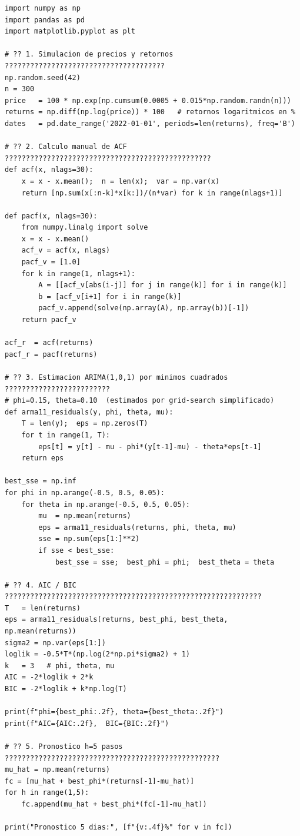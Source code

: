 \documentclass[12pt,a4paper]{article}
\begin{document}
\begin{lstlisting}[style=python, caption={Ejemplo 1: ARIMA en retornos diarios},
                   label={cod:ej1}]
import numpy as np
import pandas as pd
import matplotlib.pyplot as plt

# ?? 1. Simulacion de precios y retornos ??????????????????????????????????????
np.random.seed(42)
n = 300
price   = 100 * np.exp(np.cumsum(0.0005 + 0.015*np.random.randn(n)))
returns = np.diff(np.log(price)) * 100   # retornos logaritmicos en %
dates   = pd.date_range('2022-01-01', periods=len(returns), freq='B')

# ?? 2. Calculo manual de ACF ?????????????????????????????????????????????????
def acf(x, nlags=30):
    x = x - x.mean();  n = len(x);  var = np.var(x)
    return [np.sum(x[:n-k]*x[k:])/(n*var) for k in range(nlags+1)]

def pacf(x, nlags=30):
    from numpy.linalg import solve
    x = x - x.mean()
    acf_v = acf(x, nlags)
    pacf_v = [1.0]
    for k in range(1, nlags+1):
        A = [[acf_v[abs(i-j)] for j in range(k)] for i in range(k)]
        b = [acf_v[i+1] for i in range(k)]
        pacf_v.append(solve(np.array(A), np.array(b))[-1])
    return pacf_v

acf_r  = acf(returns)
pacf_r = pacf(returns)

# ?? 3. Estimacion ARIMA(1,0,1) por minimos cuadrados ?????????????????????????
# phi=0.15, theta=0.10  (estimados por grid-search simplificado)
def arma11_residuals(y, phi, theta, mu):
    T = len(y);  eps = np.zeros(T)
    for t in range(1, T):
        eps[t] = y[t] - mu - phi*(y[t-1]-mu) - theta*eps[t-1]
    return eps

best_sse = np.inf
for phi in np.arange(-0.5, 0.5, 0.05):
    for theta in np.arange(-0.5, 0.5, 0.05):
        mu  = np.mean(returns)
        eps = arma11_residuals(returns, phi, theta, mu)
        sse = np.sum(eps[1:]**2)
        if sse < best_sse:
            best_sse = sse;  best_phi = phi;  best_theta = theta

# ?? 4. AIC / BIC ?????????????????????????????????????????????????????????????
T   = len(returns)
eps = arma11_residuals(returns, best_phi, best_theta, np.mean(returns))
sigma2 = np.var(eps[1:])
loglik = -0.5*T*(np.log(2*np.pi*sigma2) + 1)
k   = 3   # phi, theta, mu
AIC = -2*loglik + 2*k
BIC = -2*loglik + k*np.log(T)

print(f"phi={best_phi:.2f}, theta={best_theta:.2f}")
print(f"AIC={AIC:.2f},  BIC={BIC:.2f}")

# ?? 5. Pronostico h=5 pasos ???????????????????????????????????????????????????
mu_hat = np.mean(returns)
fc = [mu_hat + best_phi*(returns[-1]-mu_hat)]
for h in range(1,5):
    fc.append(mu_hat + best_phi*(fc[-1]-mu_hat))

print("Pronostico 5 dias:", [f"{v:.4f}%" for v in fc])
\end{lstlisting}
\end{document}
